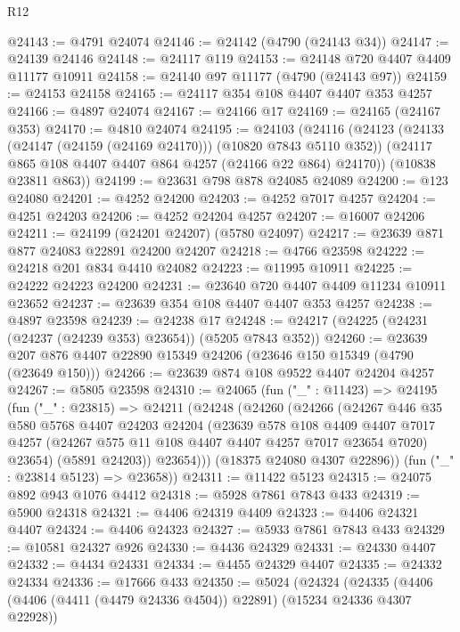 \begin{lexlean}{R12}
\begin{coremodule}
@24143 := @4791 @24074
@24146 := @24142 (@4790 (@24143 @34))
@24147 := @24139 @24146
@24148 := @24117 @119
@24153 := @24148 @720 @4407 @4409 @11177 @10911
@24158 := @24140 @97 @11177 (@4790 (@24143 @97))
@24159 := @24153 @24158
@24165 := @24117 @354 @108 @4407 @4407 @353 @4257
@24166 := @4897 @24074
@24167 := @24166 @17
@24169 := @24165 (@24167 @353)
@24170 := @4810 @24074
@24195 := @24103
    (@24116
      (@24123
        (@24133 (@24147 (@24159 (@24169 @24170))) (@10820 @7843 @5110 @352))
        (@24117 @865 @108 @4407 @4407 @864 @4257 (@24166 @22 @864) @24170))
      (@10838 @23811 @863))
@24199 := @23631 @798 @878 @24085 @24089
@24200 := @123 @24080
@24201 := @4252 @24200
@24203 := @4252 @7017 @4257
@24204 := @4251 @24203
@24206 := @4252 @24204 @4257
@24207 := @16007 @24206
@24211 := @24199 (@24201 @24207) (@5780 @24097)
@24217 := @23639 @871 @877 @24083 @22891 @24200 @24207
@24218 := @4766 @23598
@24222 := @24218 @201 @834 @4410 @24082
@24223 := @11995 @10911
@24225 := @24222 @24223 @24200
@24231 := @23640 @720 @4407 @4409 @11234 @10911 @23652
@24237 := @23639 @354 @108 @4407 @4407 @353 @4257
@24238 := @4897 @23598
@24239 := @24238 @17
@24248 := @24217 (@24225 (@24231 (@24237 (@24239 @353) @23654)) (@5205 @7843 @352))
@24260 := @23639 @207 @876 @4407 @22890 @15349 @24206 (@23646 @150 @15349 (@4790 (@23649 @150)))
@24266 := @23639 @874 @108 @9522 @4407 @24204 @4257
@24267 := @5805 @23598
@24310 := @24065
    (fun ("_" : @11423) =>
    @24195
      (fun ("_" : @23815) =>
      @24211
        (@24248
          (@24260
            (@24266
              (@24267
                @446
                @35
                @580
                @5768
                @4407
                @24203
                @24204
                (@23639
                  @578
                  @108
                  @4409
                  @4407
                  @7017
                  @4257
                  (@24267 @575 @11 @108 @4407 @4407 @4257 @7017 @23654 @7020)
                  @23654)
                (@5891 @24203))
              @23654)))
        (@18375 @24080 @4307 @22896))
      (fun ("_" : @23814 @5123) => @23658))
@24311 := @11422 @5123
@24315 := @24075 @892 @943 @1076 @4412
@24318 := @5928 @7861 @7843 @433
@24319 := @5900 @24318
@24321 := @4406 @24319 @4409
@24323 := @4406 @24321 @4407
@24324 := @4406 @24323
@24327 := @5933 @7861 @7843 @433
@24329 := @10581 @24327 @926
@24330 := @4436 @24329
@24331 := @24330 @4407
@24332 := @4434 @24331
@24334 := @4455 @24329 @4407
@24335 := @24332 @24334
@24336 := @17666 @433
@24350 := @5024
    (@24324
      (@24335
        (@4406 (@4406 (@4411 (@4479 @24336 @4504)) @22891) (@15234 @24336 @4307 @22928))

\end{coremodule}
\end{lexlean}
